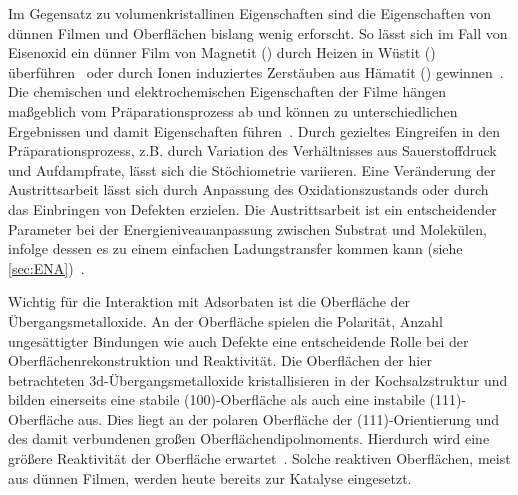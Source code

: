         Im Gegensatz zu volumenkristallinen Eigenschaften sind die Eigenschaften von dünnen Filmen und Oberflächen bislang wenig erforscht.
        So lässt sich im Fall von Eisenoxid ein dünner Film von Magnetit () durch Heizen in Wüstit () überführen~\cite{FeO_1} oder durch Ionen induziertes Zerstäuben aus Hämatit () gewinnen~\cite{FeO_36}.
        Die chemischen und elektrochemischen Eigenschaften der Filme hängen maßgeblich vom Präparationsprozess ab und können zu unterschiedlichen Ergebnissen und damit Eigenschaften führen~\cite{Uni-Tübingen}.
        Durch gezieltes Eingreifen in den Präparationsprozess, z.B. durch Variation des Verhältnisses aus Sauerstoffdruck und Aufdampfrate, lässt sich die Stöchiometrie variieren.
        Eine Veränderung der Austrittsarbeit lässt sich durch Anpassung des Oxidationszustands oder durch das Einbringen von Defekten erzielen.
        Die Austrittsarbeit ist ein entscheidender Parameter bei der Energieniveauanpassung zwischen Substrat und Molekülen, infolge dessen es zu einem einfachen Ladungstransfer kommen kann (siehe \autoref{sec:ENA})~\cite{IF_3}.

        Wichtig für die Interaktion mit Adsorbaten ist die Oberfläche der Übergangsmetalloxide.
        An der Oberfläche spielen die Polarität, Anzahl ungesättigter Bindungen wie auch Defekte eine entscheidende Rolle bei der Oberflächenrekonstruktion und Reaktivität.
        Die Oberflächen der hier betrachteten 3d-Übergangsmetalloxide kristallisieren in der Kochsalzstruktur und bilden einerseits eine stabile (100)-Oberfläche als auch eine instabile (111)-Oberfläche aus.
        Dies liegt an der polaren Oberfläche der (111)-Orientierung und des damit verbundenen großen Oberflächendipolmoments.
        Hierdurch wird eine größere Reaktivität der Oberfläche erwartet~\cite{cappus_hydroxyl_1993}.
        Solche reaktiven Oberflächen, meist aus dünnen Filmen, werden heute bereits zur Katalyse eingesetzt.
    
